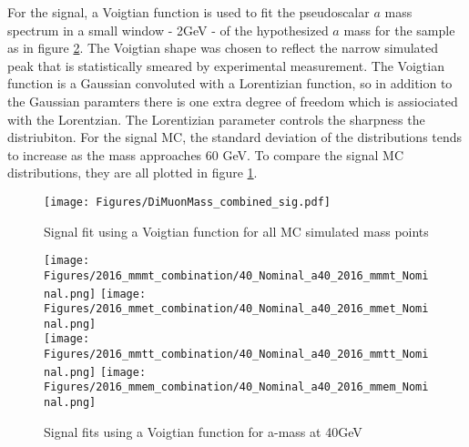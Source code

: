 
For the signal, a Voigtian function is used to fit the pseudoscalar $a$ mass spectrum in a small window - 2GeV - of the hypothesized $a$ mass for the sample as in figure \ref{fig:fit_sig}. The Voigtian shape was chosen to reflect the narrow simulated peak that is statistically smeared by experimental measurement. The Voigtian function is a Gaussian convoluted with a Lorentizian function, so in addition to the Gaussian paramters there is one extra degree of freedom which is assiociated with the Lorentzian. The Lorentizian parameter controls the sharpness the distriubiton.  
For the signal MC, the standard deviation of the distributions tends to increase as the mass approaches 60 GeV. 
To compare the signal MC distributions, they are all plotted in figure \ref{fig:fit_sig_all}.


\begin{figure}[ht!b]
    \centering 
    \texttt{[image: Figures/DiMuonMass\_combined\_sig.pdf]}
    \caption{\label{fig:fit_sig_all} Signal fit using a Voigtian function for all MC simulated mass points}
\end{figure}
\begin{figure}[ht!b]
  \centering
  \texttt{[image: Figures/2016\_mmmt\_combination/40\_Nominal\_a40\_2016\_mmmt\_Nominal.png]}
  \texttt{[image: Figures/2016\_mmet\_combination/40\_Nominal\_a40\_2016\_mmet\_Nominal.png]}\\
  \texttt{[image: Figures/2016\_mmtt\_combination/40\_Nominal\_a40\_2016\_mmtt\_Nominal.png]}
  \texttt{[image: Figures/2016\_mmem\_combination/40\_Nominal\_a40\_2016\_mmem\_Nominal.png]}\\
    \caption{\label{fig:fit_sig} Signal fits using a Voigtian function for a-mass at 40GeV }
\end{figure}

